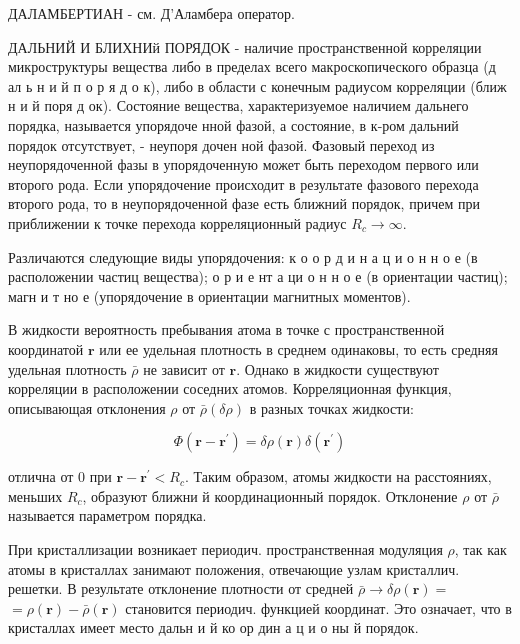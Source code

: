\documentclass[10pt]{article}
\begin{document}
ДАЛАМБЕРТИАН - см. Д'Аламбера оператор.



ДАЛЬНИЙ И БЛИХНИй ПОРЯДОК - наличие пространственной корреляции микроструктуры вещества либо в пределах всего макроскопического образца (д ал ь н и й п о р я д о к), либо в области с конечным радиусом корреляции (ближ н и й поря д ок). Состояние вещества, характеризуемое наличием дальнего порядка, называется упорядоче нной фазой, а состояние, в к-ром дальний порядок отсутствует, - неупоря дочен ной фазой. Фазовый переход из неупорядоченной фазы в упорядоченную может быть переходом первого или второго рода. Если упорядочение происходит в результате фазового перехода второго рода, то в неупорядоченной фазе есть ближний порядок, причем при приближении к точке перехода корреляционный радиус $R_{c} \rightarrow \infty$.



Различаются следующие виды упорядочения: к о о р д и н а ц и о н н о е (в расположении частиц вещества); о р и е нт а ци о н н о е (в ориентации частиц); магн и т но е (упорядочение в ориентации магнитных моментов).



В жидкости вероятность пребывания атома в точке с пространственной координатой $\boldsymbol{r}$ или ее удельная плотность в среднем одинаковы, то есть средняя удельная плотность $\bar{\rho}$ не зависит от $\boldsymbol{r}$. Однако в жидкости существуют корреляции в расположении соседних атомов. Корреляционная функция, описывающая отклонения $\rho$ от $\bar{\rho}(\delta \rho)$ в разных точках жидкости:



\[

\Phi\left(\boldsymbol{r}-\boldsymbol{r}^{\prime}\right)=\delta \rho(\boldsymbol{r}) \delta\left(\boldsymbol{r}^{\prime}\right)

\]



отлична от 0 при $\boldsymbol{r}-\boldsymbol{r}^{\prime}<R_{c}$. Таким образом, атомы жидкости на расстояниях, меньших $R_{c}$, образуют ближни й координационный порядок. Отклонение $\rho$ от $\bar{\rho}$ называется параметром порядка.



При кристаллизации возникает периодич. пространственная модуляция $\rho$, так как атомы в кристаллах занимают положения, отвечающие узлам кристаллич. решетки. В результате отклонение плотности от средней $\bar{\rho} \rightarrow \delta \rho(\boldsymbol{r})=$ $=\rho(\boldsymbol{r})-\bar{\rho}(\boldsymbol{r})$ становится периодич. функцией координат. Это означает, что в кристаллах имеет место дальн и й ко ор дин а ц и о ны й порядок.
\end{document}
